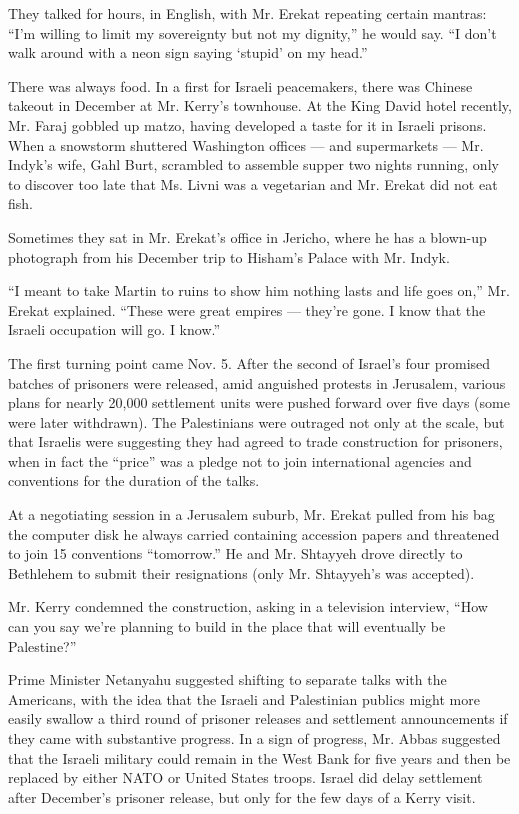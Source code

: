 They talked for hours, in English, with Mr. Erekat repeating certain
mantras: ``I'm willing to limit my sovereignty but not my dignity,'' he
would say. ``I don't walk around with a neon sign saying `stupid' on my
head.''

There was always food. In a first for Israeli peacemakers, there was
Chinese takeout in December at Mr. Kerry's townhouse. At the King David
hotel recently, Mr. Faraj gobbled up matzo, having developed a taste for
it in Israeli prisons. When a snowstorm shuttered Washington offices ---
and supermarkets --- Mr. Indyk's wife, Gahl Burt, scrambled to assemble
supper two nights running, only to discover too late that Ms. Livni was
a vegetarian and Mr. Erekat did not eat fish.

Sometimes they sat in Mr. Erekat's office in Jericho, where he has a
blown-up photograph from his December trip to Hisham's Palace with Mr.
Indyk.

``I meant to take Martin to ruins to show him nothing lasts and life
goes on,'' Mr. Erekat explained. ``These were great empires --- they're
gone. I know that the Israeli occupation will go. I know.''

The first turning point came Nov. 5. After the second of Israel's four
promised batches of prisoners were released, amid anguished protests in
Jerusalem, various plans for nearly 20,000 settlement units were pushed
forward over five days (some were later withdrawn). The Palestinians
were outraged not only at the scale, but that Israelis were suggesting
they had agreed to trade construction for prisoners, when in fact the
``price'' was a pledge not to join international agencies and
conventions for the duration of the talks.

At a negotiating session in a Jerusalem suburb, Mr. Erekat pulled from
his bag the computer disk he always carried containing accession papers
and threatened to join 15 conventions ``tomorrow.'' He and Mr. Shtayyeh
drove directly to Bethlehem to submit their resignations (only Mr.
Shtayyeh's was accepted).

Mr. Kerry condemned the construction, asking in a television interview,
``How can you say we're planning to build in the place that will
eventually be Palestine?''

Prime Minister Netanyahu suggested shifting to separate talks with the
Americans, with the idea that the Israeli and Palestinian publics might
more easily swallow a third round of prisoner releases and settlement
announcements if they came with substantive progress. In a sign of
progress, Mr. Abbas suggested that the Israeli military could remain in
the West Bank for five years and then be replaced by either NATO or
United States troops. Israel did delay settlement after December's
prisoner release, but only for the few days of a Kerry visit.

